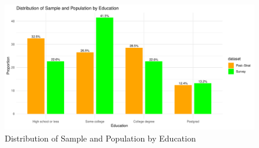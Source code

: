 \documentclass[
  letterpaper,
  DIV=11,
  numbers=noendperiod]{scrartcl}
\begin{document}
\begin{figure}

{\centering \includegraphics{paper_files/figure-pdf/fig-distribution-by-education-1.pdf}

}

\caption{\label{fig-distribution-by-education}Distribution of Sample and
Population by Education}

\end{figure}

\hypertarget{tbl-voters-intention-to-vote-for-trump}{}
\begin{table}[!h]
\caption{\label{tbl-voters-intention-to-vote-for-trump}Voters Intention to Support Trump }\tabularnewline

\centering
{}
\end{table}

\hypertarget{tbl-voters-intention-of-their-primary-party}{}
\begin{table}[!h]
\caption{\label{tbl-voters-intention-of-their-primary-party}Voters Intention of Their Primary Party }\tabularnewline

\centering
{}
\end{table}
\end{document}
